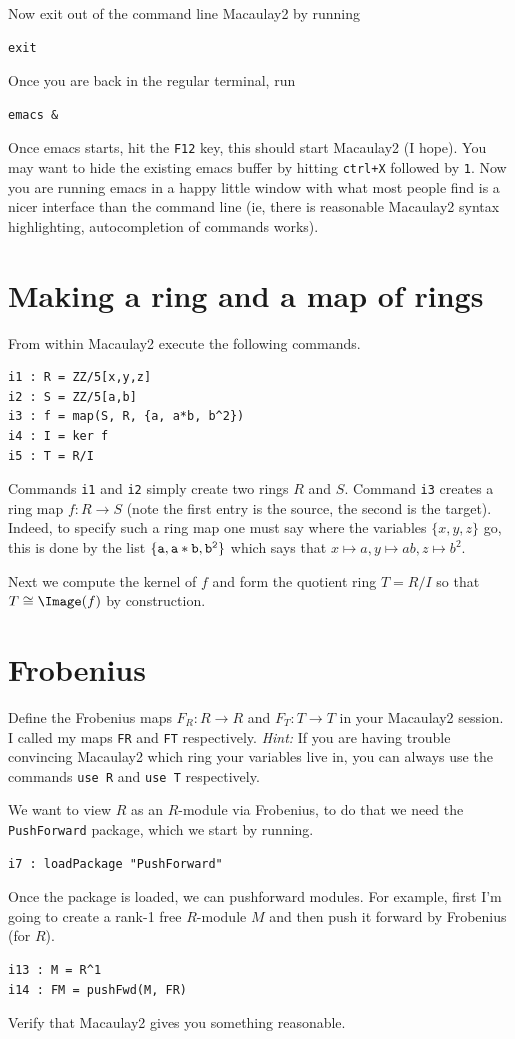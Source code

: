\documentclass[12pt]{amsart}
\numberwithin{equation}{theorem}
\renewcommand{\:}{\colon}
\begin{document}
Now exit out of the command line Macaulay2 by running
\begin{verbatim}
exit
\end{verbatim}
Once you are back in the regular terminal, run
\begin{verbatim}
emacs &
\end{verbatim}
Once emacs starts, hit the {\tt F12} key, this should start Macaulay2 (I hope).  You may want to hide the existing emacs buffer by hitting {\tt ctrl+X} followed by {\tt 1}.  Now you are running emacs in a happy little window with what most people find is a nicer interface than the command line (ie, there is reasonable Macaulay2 syntax highlighting, autocompletion of commands works).

\section{Making a ring and a map of rings}
From within Macaulay2 execute the following commands.
\begin{verbatim}
i1 : R = ZZ/5[x,y,z]
i2 : S = ZZ/5[a,b]
i3 : f = map(S, R, {a, a*b, b^2})
i4 : I = ker f
i5 : T = R/I
\end{verbatim}
Commands {\tt i1} and {\tt i2} simply create two rings $R$ and $S$.  Command {\tt i3} creates a ring map $f : R \to S$ (note the first entry is the source, the second is the target).  Indeed, to specify such a ring map one must say where the variables $\{x, y, z\}$ go, this is done by the list ${\tt \{a, a*b, b^2\}}$ which says that $x \mapsto a, y \mapsto ab, z \mapsto b^2$.

Next we compute the kernel of $f$ and form the quotient ring $T = R/I$ so that $T \cong \Image(f)$ by construction.

\section{Frobenius}

\begin{exercise*}
Define the Frobenius maps $F_R : R \to R$ and $F_T : T \to T$ in your Macaulay2 session.  I called my maps {\tt FR} and {\tt FT} respectively.
\vskip 3pt
\emph{Hint:} If you are having trouble convincing Macaulay2 which ring your variables live in, you can always use the commands {\tt use R} and {\tt use T} respectively.
\end{exercise*}

We want to view $R$ as an $R$-module via Frobenius, to do that we need the {\tt PushForward} package, which we start by running.
\begin{verbatim}
i7 : loadPackage "PushForward"
\end{verbatim}
Once the package is loaded, we can pushforward modules.  For example, first I'm going to create a rank-1 free $R$-module $M$ and then push it forward by Frobenius (for $R$).
\begin{verbatim}
i13 : M = R^1
i14 : FM = pushFwd(M, FR)
\end{verbatim}
Verify that Macaulay2 gives you something reasonable.
\end{document}
